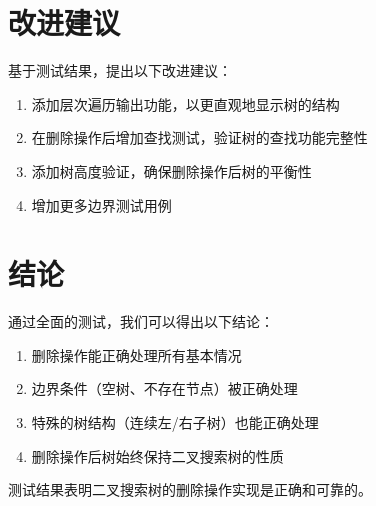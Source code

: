 \documentclass[UTF8]{ctexart}
\begin{document}
\section{改进建议}

基于测试结果，提出以下改进建议：

\begin{enumerate}
    \item 添加层次遍历输出功能，以更直观地显示树的结构
    \item 在删除操作后增加查找测试，验证树的查找功能完整性
    \item 添加树高度验证，确保删除操作后树的平衡性
    \item 增加更多边界测试用例
\end{enumerate}

\section{结论}

通过全面的测试，我们可以得出以下结论：

\begin{enumerate}
    \item 删除操作能正确处理所有基本情况
    \item 边界条件（空树、不存在节点）被正确处理
    \item 特殊的树结构（连续左/右子树）也能正确处理
    \item 删除操作后树始终保持二叉搜索树的性质
\end{enumerate}

测试结果表明二叉搜索树的删除操作实现是正确和可靠的。
\end{document}
